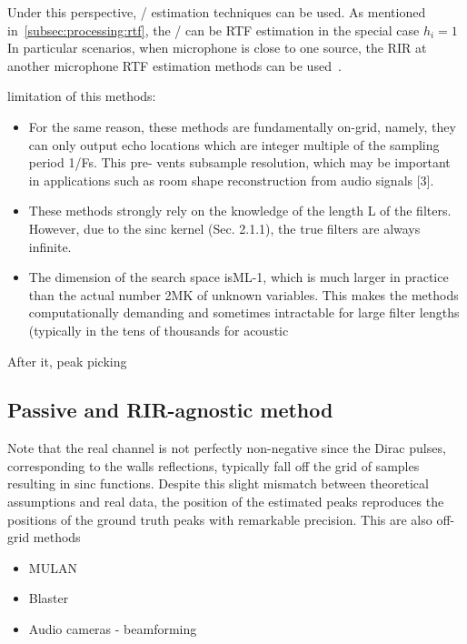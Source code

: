 Under this perspective, \RTF/ estimation techniques can be used.
As mentioned in~\cref{subsec:processing:rtf}, the \RTF/ can be
RTF estimation in the special case $h_i = 1$
In particular scenarios, when microphone is close to one source, the RIR at another microphone RTF estimation methods can be used~.

limitation of this methods:

\begin{itemize}
    \item For the same reason, these methods are fundamentally on-grid, namely, they can only output echo locations which are integer multiple of the sampling period 1/Fs. This pre- vents subsample resolution, which may be important in applications such as room shape reconstruction from audio signals [3].
    \item These methods strongly rely on the knowledge of the length L of the filters. However, due to the sinc kernel (Sec. 2.1.1), the true filters are always infinite.
    \item The dimension of the search space isML-1, which is much larger in practice than the actual number 2MK of unknown variables. This makes the methods computationally demanding and sometimes intractable for large filter lengths (typically in the tens of thousands for acoustic
\end{itemize}

After it, peak picking

\subsection{Passive and RIR-agnostic method}
Note that the real channel is not perfectly non-negative since the Dirac pulses, corresponding to the walls reflections, typically fall off the grid of samples resulting in sinc functions. Despite this slight mismatch between theoretical assumptions and real data, the position of the estimated peaks reproduces the positions of the ground truth peaks with remarkable precision.
This are also off-grid methods
\begin{itemize}
    \item MULAN 
    \item Blaster 
    \item Audio cameras - beamforming~
\end{itemize}

